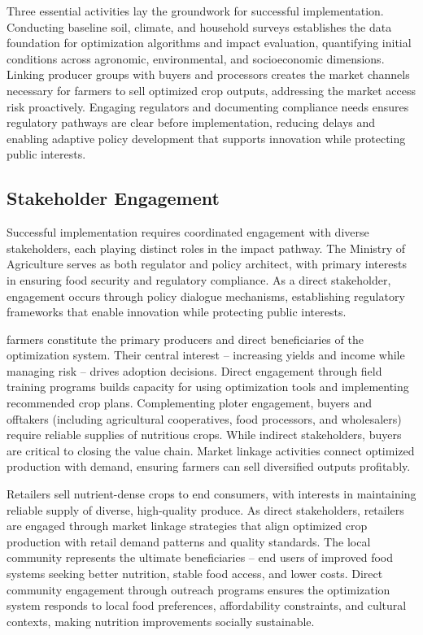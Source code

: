 \documentclass{oqireport}
\begin{document}
Three essential activities lay the groundwork for successful implementation. Conducting baseline soil, climate, and household surveys establishes the data foundation for optimization algorithms and impact evaluation, quantifying initial conditions across agronomic, environmental, and socioeconomic dimensions. Linking producer groups with buyers and processors creates the market channels necessary for farmers to sell optimized crop outputs, addressing the market access risk proactively. Engaging regulators and documenting compliance needs ensures regulatory pathways are clear before implementation, reducing delays and enabling adaptive policy development that supports innovation while protecting public interests.

\subsection{Stakeholder Engagement}

Successful implementation requires coordinated engagement with diverse stakeholders, each playing distinct roles in the impact pathway. The Ministry of Agriculture serves as both regulator and policy architect, with primary interests in ensuring food security and regulatory compliance. As a direct stakeholder, engagement occurs through policy dialogue mechanisms, establishing regulatory frameworks that enable innovation while protecting public interests.

farmers constitute the primary producers and direct beneficiaries of the optimization system. Their central interest -- increasing yields and income while managing risk -- drives adoption decisions. Direct engagement through field training programs builds capacity for using optimization tools and implementing recommended crop plans. Complementing ploter engagement, buyers and offtakers (including agricultural cooperatives, food processors, and wholesalers) require reliable supplies of nutritious crops. While indirect stakeholders, buyers are critical to closing the value chain. Market linkage activities connect optimized production with demand, ensuring farmers can sell diversified outputs profitably.

Retailers sell nutrient-dense crops to end consumers, with interests in maintaining reliable supply of diverse, high-quality produce. As direct stakeholders, retailers are engaged through market linkage strategies that align optimized crop production with retail demand patterns and quality standards. The local community represents the ultimate beneficiaries -- end users of improved food systems seeking better nutrition, stable food access, and lower costs. Direct community engagement through outreach programs ensures the optimization system responds to local food preferences, affordability constraints, and cultural contexts, making nutrition improvements socially sustainable.
\end{document}
